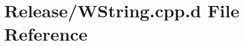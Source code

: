 \hypertarget{_release_2_w_string_8cpp_8d}{\section{\-Release/\-W\-String.cpp.\-d \-File \-Reference}
\label{_release_2_w_string_8cpp_8d}
}

